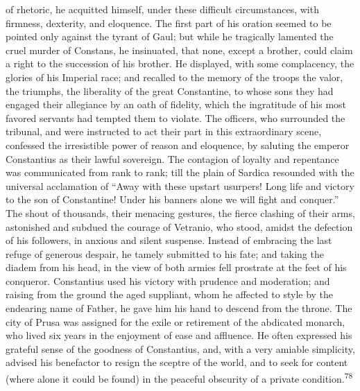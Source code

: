 of rhetoric, he acquitted himself, under these difficult
circumstances, with firmness, dexterity, and eloquence. The first
part of his oration seemed to be pointed only against the tyrant
of Gaul; but while he tragically lamented the cruel murder of
Constans, he insinuated, that none, except a brother, could claim
a right to the succession of his brother. He displayed, with some
complacency, the glories of his Imperial race; and recalled to
the memory of the troops the valor, the triumphs, the liberality
of the great Constantine, to whose sons they had engaged their
allegiance by an oath of fidelity, which the ingratitude of his
most favored servants had tempted them to violate. The officers,
who surrounded the tribunal, and were instructed to act their
part in this extraordinary scene, confessed the irresistible
power of reason and eloquence, by saluting the emperor
Constantius as their lawful sovereign. The contagion of loyalty
and repentance was communicated from rank to rank; till the plain
of Sardica resounded with the universal acclamation of “Away with
these upstart usurpers! Long life and victory to the son of
Constantine! Under his banners alone we will fight and conquer.”
The shout of thousands, their menacing gestures, the fierce
clashing of their arms, astonished and subdued the courage of
Vetranio, who stood, amidst the defection of his followers, in
anxious and silent suspense. Instead of embracing the last refuge
of generous despair, he tamely submitted to his fate; and taking
the diadem from his head, in the view of both armies fell
prostrate at the feet of his conqueror. Constantius used his
victory with prudence and moderation; and raising from the ground
the aged suppliant, whom he affected to style by the endearing
name of Father, he gave him his hand to descend from the throne.
The city of Prusa was assigned for the exile or retirement of the
abdicated monarch, who lived six years in the enjoyment of ease
and affluence. He often expressed his grateful sense of the
goodness of Constantius, and, with a very amiable simplicity,
advised his benefactor to resign the sceptre of the world, and to
seek for content (where alone it could be found) in the peaceful
obscurity of a private condition.\textsuperscript{78}



